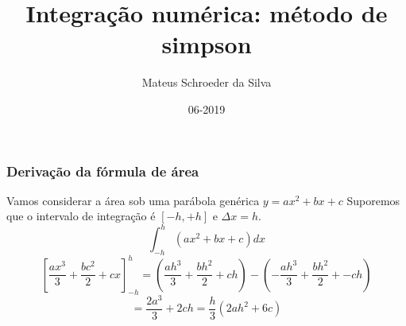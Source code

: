 \documentclass{beamer}
\title{Integração numérica: método de simpson}
\author[Mateus]
{Mateus Schroeder da Silva}
\institute{UDESC}
\date{06-2019}
\begin{document}
 
\frame{\titlepage}
 

					
\begin{frame}
\frametitle{Derivação da fórmula de área}
Vamos considerar a área sob uma parábola genérica $y = ax^2 + bx + c$
Suporemos que o intervalo de integração é $[-h, +h]$ e $\Delta x = h$.
$$ \int_{-h}^h {(ax^2 + bx + c) dx}$$
$$ \left[ \dfrac{ax^3}{3} + \dfrac{bc^2}{2} + cx \right]_{-h}^{h} = \left( \dfrac{ah^3}{3} + \dfrac{bh^2}{2} + ch \right) -  \left( -\dfrac{ah^3}{3} + \dfrac{bh^2}{2} + -ch \right)$$
$$= \dfrac{2a^3}{3} + 2ch = \dfrac{h}{3} \left( 2ah^2 + 6c \right)$$
\end{frame}
\end{document}
